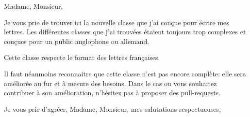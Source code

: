 \documentclass[12pt]{frenchletter}
\date{\today}
\begin{document}
    \opening{Madame, Monsieur,}

    Je vous prie de trouver ici la nouvelle classe que j'ai conçue pour écrire mes lettres. Les différentes classes que j'ai trouvées étaient toujours trop complexes et conçues pour un public anglophone ou allemand.

    Cette classe respecte le format des lettres françaises.

    Il faut néanmoins reconnaitre que cette classe n'est pas encore complète: elle sera améliorée au fur et à mesure des besoins. Dans le cas ou vous souhaitez contribuer à son amélioration, n'hésitez pas à proposer des pull-requests.

    \closing{Je vous prie d'agréer, Madame, Monsieur, mes salutations respectueuses,}
\end{document}
